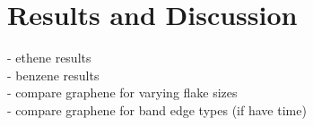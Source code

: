 \chapter{Results and Discussion}\label{ch:Results}
- ethene results \\
- benzene results \\
- compare graphene for varying flake sizes \\
- compare graphene for band edge types (if have time) \\

